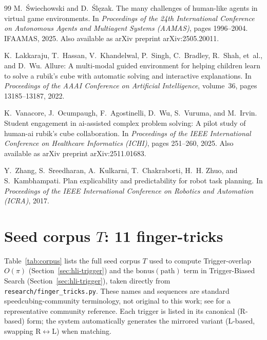 \documentclass[10pt,conference]{article}
\begin{document}
\begin{thebibliography}{99}
M.~{\'S}wiechowski and D.~{\'S}l{\k{e}}zak.
\newblock The many challenges of human-like agents in virtual game
  environments.
\newblock In \emph{Proceedings of the 24th International Conference on
  Autonomous Agents and Multiagent Systems (AAMAS)}, pages 1996--2004.
  IFAAMAS, 2025.
\newblock Also available as arXiv preprint arXiv:2505.20011.

K.~Lakkaraju, T.~Hassan, V.~Khandelwal, P.~Singh, C.~Bradley, R.~Shah, et~al.,
  and D.~Wu.
\newblock Allure: A multi-modal guided environment for helping children
  learn to solve a rubik's cube with automatic solving and interactive
  explanations.
\newblock In \emph{Proceedings of the AAAI Conference on Artificial
  Intelligence}, volume~36, pages 13185--13187, 2022.

K.~Vanacore, J.~Ocumpaugh, F.~Agostinelli, D.~Wu, S.~Vuruma, and M.~Irvin.
\newblock Student engagement in ai-assisted complex problem solving: A
  pilot study of human-ai rubik's cube collaboration.
\newblock In \emph{Proceedings of the IEEE International Conference on
  Healthcare Informatics (ICHI)}, pages 251--260, 2025.
\newblock Also available as arXiv preprint arXiv:2511.01683.

Y.~Zhang, S.~Sreedharan, A.~Kulkarni, T.~Chakraborti, H.~H. Zhuo, and
  S.~Kambhampati.
\newblock Plan explicability and predictability for robot task planning.
\newblock In \emph{Proceedings of the IEEE International Conference on
  Robotics and Automation (ICRA)}, 2017.

\end{thebibliography}

\appendix
\section{Seed corpus $T$: 11 finger-tricks}
\label{app:corpus}

Table~\ref{tab:corpus} lists the full seed corpus $T$ used to compute
Trigger-overlap $O(\pi)$ (Section~\ref{sec:hli-trigger}) and the
$\mathrm{bonus}(\mathrm{path})$ term in Trigger-Biased Search
(Section~\ref{sec:hli-trigger}), taken directly from
\texttt{research/finger\_tricks.py}. These names and sequences are
standard speedcubing-community terminology, not original to this
work; see \citet{jperm-fingertricks} for a representative
community reference. Each trigger is listed in its
canonical (R-based) form; the system automatically generates the
mirrored variant (L-based, swapping R$\leftrightarrow$L) when
matching.
\end{document}
